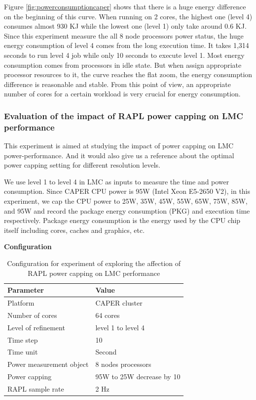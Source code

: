 \noindent

Figure \ref{fig:powerconsumptioncaper} shows that there is a huge energy difference on the beginning of this curve. When running on 2 cores, the highest one (level 4) consumes almost 930 KJ while the lowest one (level 1) only take around 0.6 KJ. Since this experiment measure the all 8 node processors power status, the huge energy consumption of level 4 comes from the long execution time. It takes 1,314 seconds to run level 4 job while only 10 seconds to execute level 1. Most energy consumption comes from processors in idle state. But when assign appropriate processor resources to it, the curve reaches the flat zoom, the energy consumption difference is reasonable and stable. From this point of view, an appropriate number of cores for a certain workload is very crucial for energy consumption.



\subsubsection{Evaluation of the impact of RAPL power capping on LMC performance }
This experiment is aimed at studying the impact of power capping on LMC power-performance. And it would also give us a reference about the optimal power capping setting for different resolution levels. 



We use level 1 to level 4 in LMC as inputs to measure the time and power consumption. Since CAPER CPU power is 95W (Intel Xeon E5-2650 V2), in this experiment, we cap the CPU power to 25W, 35W, 45W, 55W, 65W, 75W, 85W, and 95W and record the package energy consumption (PKG) and execution time respectively. Package energy consumption is the energy used by the CPU chip itself including cores, caches and graphics, etc. 


\noindent
\textbf{Configuration}
\begin{table}[H]
\begin{center}
\begin{tabular}{|l|l|}
	\hline
	\textbf{Parameter} & \textbf{Value}\\ \hline
    Platform & CAPER cluster\\ 		\hline
    Number of cores & 64 cores\\
	\hline
    Level of refinement  & level 1 to level 4\\
    \hline
    Time step & 10\\
    \hline
    Time unit & Second\\
    \hline
    Power measurement object & 8 nodes processors\\
    \hline
    Power capping & 95W to 25W decrease by 10\\
    \hline
    RAPL sample rate & 2 Hz\\
    \hline
\end{tabular}
\end{center}
\caption{Configuration for experiment of exploring the affection of RAPL power capping on LMC performance 
}
\label{table:table_rapl_capping}
\end{table}

